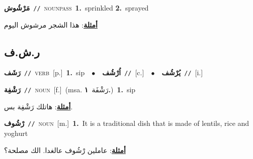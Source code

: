 \documentclass[10pt,a4paper,twoside]{article} %
\begin{document}
\begin{multicols}{2}
{\setlength\topsep{0pt}\textbf{\foreignlanguage{arabic}{مَرْشُوش}}\ {\color{gray}\texttt{//}\color{black}}\ \textsc{noun\textunderscore pass}\ \textbf{1.}~sprinkled  \textbf{2.}~sprayed\  \begin{flushright}\color{gray}\foreignlanguage{arabic}{\textbf{\underline{\foreignlanguage{arabic}{أمثلة}}}: هذا الشجر مرشوش اليوم}\end{flushright}\color{black}} \vspace{2mm}

\vspace{-3mm}
\subsection*{\color{blue}\foreignlanguage{arabic}{ر.ش.ف}\color{blue}{}} 

{\setlength\topsep{0pt}\textbf{\foreignlanguage{arabic}{رَشَف}}\ {\color{gray}\texttt{//}\color{black}}\ \textsc{verb}\ [p.]\ \textbf{1.}~sip\ \ $\bullet$\ \ \setlength\topsep{0pt}\textbf{\foreignlanguage{arabic}{اُرْشُف}}\ {\color{gray}\texttt{//}\color{black}}\ [c.]\ \ $\bullet$\ \ \setlength\topsep{0pt}\textbf{\foreignlanguage{arabic}{يُرْشُف}}\ {\color{gray}\texttt{//}\color{black}}\ [i.]\ } \vspace{2mm}

{\setlength\topsep{0pt}\textbf{\foreignlanguage{arabic}{رَشْفِة}}\ {\color{gray}\texttt{//}\color{black}}\ \textsc{noun}\ [f.]\ \color{gray}(msa. \foreignlanguage{arabic}{رَشْفَة}~\foreignlanguage{arabic}{\textbf{١.}})\color{black}\ \textbf{1.}~sip\  \begin{flushright}\color{gray}\foreignlanguage{arabic}{\textbf{\underline{\foreignlanguage{arabic}{أمثلة}}}: هاتلك رَشْفِة بس.}\end{flushright}\color{black}} \vspace{2mm}

{\setlength\topsep{0pt}\textbf{\foreignlanguage{arabic}{رْشُوف}}\ {\color{gray}\texttt{//}\color{black}}\ \textsc{noun}\ [m.]\ \textbf{1.}~It is a traditional dish that is made of lentils, rice and yoghurt\  \begin{flushright}\color{gray}\foreignlanguage{arabic}{\textbf{\underline{\foreignlanguage{arabic}{أمثلة}}}: عاملين رْشُوف عالغدا. الك مصلحة؟}\end{flushright}\color{black}} \vspace{2mm}


\end{multicols}
\end{document}

